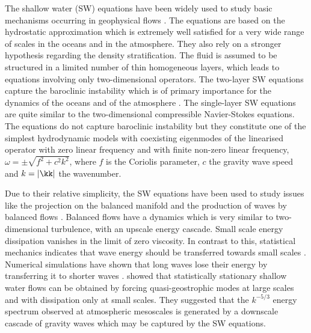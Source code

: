 The shallow water (SW) equations  have been widely used to study basic
mechanisms occurring in geophysical flows \citep[see for
example][]{VallisLIVRE2006}.
%
The equations are based on the hydrostatic approximation which is
extremely well satisfied for a very wide range of scales in the oceans
and in the atmosphere.  They also rely on a stronger hypothesis
regarding the density stratification.  The fluid is assumed to be
structured in a limited number of thin homogeneous layers, which leads
to equations involving only two-dimensional operators. The two-layer
SW equations capture the baroclinic instability which is of
primary importance for the dynamics of the oceans and of the
atmosphere \citep[]{VallisLIVRE2006, Wirth2013}.
%
The single-layer SW equations are quite similar to
the two-dimensional compressible Navier-Stokes equations.  The
equations do not capture baroclinic instability but they constitute
one of the simplest hydrodynamic models with coexisting eigenmodes of
the linearised operator with zero linear frequency and with finite
non-zero linear frequency, $\omega = \pm\sqrt{f^2 + c^2
k^2}$, where $f$ is the Coriolis parameter, $c$ the gravity wave speed and $k
= |\kk|$ the wavenumber.
%

%
Due to their relative simplicity, the SW equations have
been used to study issues like the projection on the balanced manifold
\citep[]{Lorenz1980, MohebalhojehDritschel2000} and the production of
waves by balanced flows \citep[]{FargeSadourny1989,
LahayeZeitlin2012,Vanneste2013}. Balanced flows have a dynamics which is very similar to
two-dimensional turbulence, with an upscale energy cascade. %
Small scale energy dissipation vanishes in the limit of zero
viscosity.
%
In contrast to this, statistical mechanics indicates that wave energy
should be transferred towards small scales \citep[]{Warn1986}.
Numerical simulations have shown that long waves lose their energy by
transferring it to shorter waves \citep[]{Sadourny1975,
FargeSadourny1989}.   \cite{YuanHamilton1994} showed that
statistically stationary shallow water flows can be obtained by forcing
quasi-geostrophic modes at large scales and with dissipation only at
small scales. They suggested that the $ k^{-5/3} $ energy spectrum observed at   atmospheric mesoscales  \citep[]{NastromGage1985,LiLindborg2018} is generated by a downscale cascade of gravity waves which may be captured by the SW equations.

